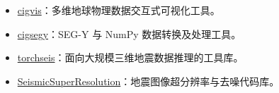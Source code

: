 \begin{itemize}
  \item \href{https://github.com/JintaoLee-Roger/cigvis}{cigvis}：多维地球物理数据交互式可视化工具。
  \item \href{https://github.com/JintaoLee-Roger/cigsegy}{cigsegy}：SEG-Y 与 NumPy 数据转换及处理工具。
  \item \href{https://github.com/JintaoLee-Roger/torchseis}{torchseis}：面向大规模三维地震数据推理的工具库。
  \item \href{https://github.com/JintaoLee-Roger/SeismicSuperResolution}{SeismicSuperResolution}：地震图像超分辨率与去噪代码库。
\end{itemize}
